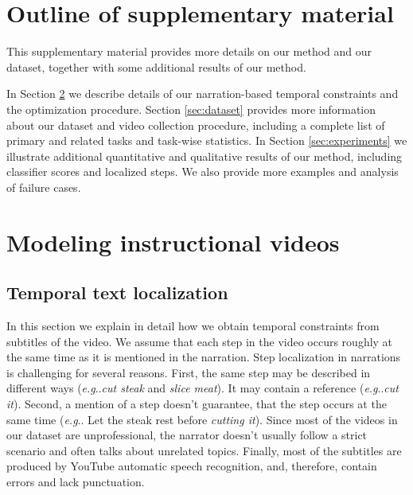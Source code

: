 \documentclass[10pt,twocolumn,letterpaper]{article}
\makeatletter
\DeclareRobustCommand\onedot{\futurelet\@let@token\@onedot}
\def\@onedot{\ifx\@let@token.\else.\null\fi\xspace}
\def\eg{\emph{e.g}\onedot} \def\Eg{\emph{E.g}\onedot}
\makeatother
\begin{document}
{\small


}

\clearpage

\appendix

\setcounter{section}{0}
\renewcommand{\thesection}{\Alph{section}}
\setcounter{table}{0}
\setcounter{figure}{0}

\section{Outline of supplementary material}
This supplementary material provides more details on our method and our dataset, together with some additional results of our method.

In Section \ref{sec:model} we describe details of our narration-based temporal constraints and the optimization procedure.
Section \ref{sec:dataset} provides more information about our dataset and video collection procedure, including a complete list of primary and related tasks and task-wise statistics.
In Section \ref{sec:experiments} we illustrate additional quantitative and qualitative results of our method, including classifier scores and localized steps.
We also provide more examples and analysis of failure cases.

\section{Modeling instructional videos}
\label{sec:model}
\subsection{Temporal text localization}
In this section we explain in detail how we obtain temporal constraints from subtitles of the video.
We assume that each step in the video occurs roughly at the same time as it is mentioned in the narration.
Step localization in narrations is challenging for several reasons.
First, the same step may be described in different ways (\eg \textit{cut steak} and \textit{slice meat}).
It may contain a reference (\eg \textit{cut it}).
Second, a mention of a step doesn't guarantee, that the step occurs at the same time (\eg Let the steak rest before \textit{cutting it}).
Since most of the videos in our dataset are unprofessional, the narrator doesn't usually follow a strict scenario and often talks about unrelated topics.
Finally, most of the subtitles are produced by YouTube automatic speech recognition, and, therefore, contain errors and lack punctuation.
\end{document}
